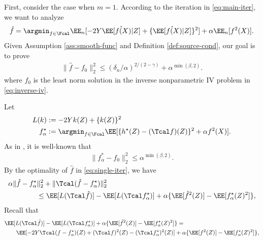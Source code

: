 \documentclass[14pt]{extarticle} %
\begin{document}
First, consider the case when $m=1$. According to the iteration in \eqref{eq:main-iter}, we want to analyze 
\begin{align}\label{eq:single-iter}
         \hat f  =\argmin_{f \in \Fcal} 
       \EE_n[ - 2 Y \hat \EE[f(X)|Z] +  \{\hat \EE[f(X)|Z]\}^2  ]   
         +\alpha \EE_n[f^2(X)]. 
    \end{align}
Given Assumption \ref{ass:smooth-func} and Definition \ref{def:source-cond}, our goal is to prove 
\begin{align*}
    \|\hat f-f_0 \|^2_2\leq  (\delta_n/\alpha)^{2/(2-\gamma)}+ \alpha^{\min(\beta,2)}. 
\end{align*}
where $f_0$ is the least norm solution in the inverse nonparametric IV problem in  \eqref{eq:inverse-iv}. 

Let 
\begin{align}\label{eq:defs}
    L(k) &:=  - 2 Y k(Z) +  \{k(Z)\}^2  \\
    f^{\star}_{\alpha} &:= \argmin_{f\in\Fcal} \EE[\{h^{\star}(Z)  - (\Tcal f)(Z) \}^2 +\alpha f^2(X) ]\nonumber. 
\end{align}
As in \citet{LiaoLuofeng2020PENE}, it is well-known that 
\begin{align*}
    \|f^{*}_{\alpha}-f_0\|^2_2 \leq \alpha^{\min(\beta,2)}. 
\end{align*}
By the optimality of $\hat{f}$ in \eqref{eq:single-iter}, we have 
\begin{align*}
    & \alpha \|\hat{f} - f^{\star}_{\alpha} \|^2_2 + \|\Tcal(\hat{f}-f^{\star}_{\alpha})\|^2_2  \\
    &\qquad\qquad\leq \EE[L(\Tcal \hat{f}) ] - \EE[L (\Tcal f^{\star}_{\alpha})] + \alpha\{\EE[\hat{f}^2(Z)] - \EE[f^{\star}_{\alpha}(Z)^2]\},
\end{align*}
Recall that \begin{align*}
    &\EE[L(\Tcal \hat{f}) ] - \EE[L (\Tcal f^{\star}_{\alpha})] + \alpha\{\EE[\hat{f}^2(Z)] - \EE[f^{\star}_{\alpha}(Z)^2]\} =\\
    &\qquad\EE[ - 2 Y  \Tcal (f-f^{\star}_{\alpha})(Z)  + (\Tcal f)^2(Z) -  (\Tcal f^{\star}_{\alpha})^2(Z) ] +  \alpha\{\EE[f^2(Z)] - \EE[f^{\star}_{\alpha}(Z)^2]\},
\end{align*}
\end{document}

